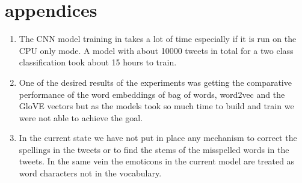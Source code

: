 \documentclass[conference]{IEEEtran}
\begin{document}
\appendices
\section*{appendices}
\begin{enumerate}
\item
The CNN model training in takes a lot of time especially if it is run on the CPU only mode. A model with about 10000 tweets in total for a two class classification took about 15 hours to train.
\item
One of the desired results of the experiments was getting the comparative performance of the word embeddings of bag of words, word2vec and the GloVE vectors but as the models took so much time to build and train we were not able to achieve the goal.
\item
In the current state we have not put in place any mechanism to correct the spellings in the tweets or to find the stems of the misspelled words in the tweets. In the same vein the emoticons in the current model are treated as word characters not in the vocabulary.


\end{enumerate}






\ifCLASSOPTIONcaptionsoff
  \newpage
\fi




\end{document}
